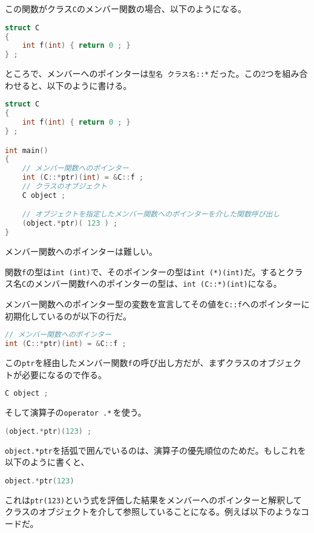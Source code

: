 この関数がクラス\texttt{C}のメンバー関数の場合、以下のようになる。

\begin{lstlisting}[language={C++}]
struct C
{
    int f(int) { return 0 ; }
} ;
\end{lstlisting}

ところで、メンバーへのポインターは\texttt{型名 クラス名::*}\,だった。この2つを組み合わせると、以下のように書ける。

\begin{lstlisting}[language={C++}]
struct C
{
    int f(int) { return 0 ; }
} ;

int main()
{
    // メンバー関数へのポインター
    int (C::*ptr)(int) = &C::f ;
    // クラスのオブジェクト
    C object ;

    // オブジェクトを指定したメンバー関数へのポインターを介した関数呼び出し
    (object.*ptr)( 123 ) ;
}
\end{lstlisting}

メンバー関数へのポインターは難しい。

関数\texttt{f}の型は\texttt{int (int)}で、そのポインターの型は\texttt{int (*)(int)}だ。するとクラス名\texttt{C}のメンバー関数\texttt{f}へのポインターの型は、\texttt{int (C::*)(int)}になる。

メンバー関数へのポインター型の変数を宣言してその値を\texttt{C::f}へのポインターに初期化しているのが以下の行だ。

\begin{lstlisting}[language={C++}]
// メンバー関数へのポインター
int (C::*ptr)(int) = &C::f ;
\end{lstlisting}

この\texttt{ptr}を経由したメンバー関数\texttt{f}の呼び出し方だが、まずクラスのオブジェクトが必要になるので作る。

\begin{lstlisting}[language={C++}]
C object ;
\end{lstlisting}

そして演算子の\texttt{operator .*}\,を使う。

\begin{lstlisting}[language={C++}]
(object.*ptr)(123) ;
\end{lstlisting}

\texttt{object.*ptr}を括弧で囲んでいるのは、演算子の優先順位のためだ。もしこれを以下のように書くと、
\begin{lstlisting}[language={C++}]
object.*ptr(123)
\end{lstlisting}
これは\texttt{ptr(123)}という式を評価した結果をメンバーへのポインターと解釈してクラスのオブジェクトを介して参照していることになる。例えば以下のようなコードだ。

